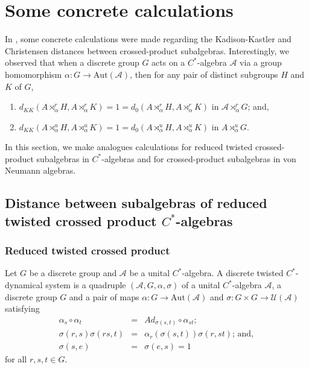 \documentclass{amsart}
\numberwithin{equation}{section}
\newcommand{\Aut}{\mathrm{Aut}}
\newcommand{\1}{\mathbf{1}}
\newcommand{\mA}{\mathcal{A}}
\begin{document}
\section{Some concrete calculations}
In \cite{GK}, some concrete calculations were made regarding
the Kadison-Kastler and Christensen distances between crossed-product
subalgebras. Interestingly, we observed that when a discrete group $G$
acts on a $C^*$-algebra $\mA$ via a group homomorphism $\alpha: G
\rightarrow \Aut(\mA) $, then for any pair of distinct subgroups $H$
and $K$ of $G$, 
\begin{enumerate}
\item $d_{KK}(A\rtimes^r_{\alpha}H, A\rtimes^r_{\alpha}K)=1 =
  d_{0}(A\rtimes^r_{\alpha}H, A\rtimes^r_{\alpha}K)$ in $\mA \rtimes^r_{\alpha}
  G$; and,
\item $d_{KK}(A\rtimes^u_{\alpha}H, A\rtimes^u_{\alpha}K)=1 =
  d_{0}(A\rtimes^u_{\alpha}H, A\rtimes^u_{\alpha}K) $ in
  $A\rtimes^u_{\alpha}G$.
\end{enumerate} 
In this section, we make analogues calculations for reduced twisted
crossed-product subalgebras in $C^*$-algebras and for crossed-product
subalgebras in von Neumann algebras.

\subsection{Distance between subalgebras of reduced twisted
  crossed product $C^*$-algebras}\label{twisted} 

\subsubsection{Reduced twisted crossed product}
Let $G$ be a discrete group and $\mA$ be a unital $C^*$-algebra. A
discrete twisted $C^*$-dynamical system is a quadruple
$(\mA,G,\alpha,\sigma)$ of a unital $C^*$-algebra $\mA$, a discrete
group $G$ and a pair of maps $\alpha : G \rightarrow
\Aut(\mA)$ and $\sigma: G\times G \rightarrow \mathcal{U}(\mA)$
satisfying
\begin{eqnarray*}
\alpha_{s}\circ \alpha_{t} & = & Ad_{\sigma(s,t)}\circ
\alpha_{st};\\ \sigma(r,s)\sigma(rs,t) & = &
\alpha_{r}(\sigma(s,t))\sigma(r,st);\, \text{and},\\ \sigma(s,e) & = &
\sigma(e,s)=1
\end{eqnarray*}
for all $r,s,t\in G$.
\end{document}
